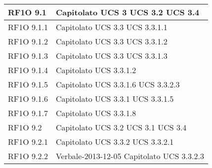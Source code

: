 \begin{center}
\begin{longtable}{ | p{5cm} | p{5cm} |}
        RF1O 9.1 &  Capitolato \newline  UCS 3 \newline  UCS 3.2 \newline  UCS 3.4 \newline  \\ \hline      
        RF1O 9.1.1 &  Capitolato \newline  UCS 3.3 \newline  UCS 3.3.1.1 \newline  \\ \hline      
        RF1O 9.1.2 &  Capitolato \newline  UCS 3.3 \newline  UCS 3.3.1.2 \newline  \\ \hline      
        RF1O 9.1.3 &  Capitolato \newline  UCS 3.3 \newline  UCS 3.3.1.3 \newline  \\ \hline      
        RF1O 9.1.4 &  Capitolato \newline  UCS 3.3.1.2 \newline  \\ \hline      
        RF1O 9.1.5 &  Capitolato \newline  UCS 3.3.1.6 \newline  UCS 3.3.2.3 \newline  \\ \hline      
        RF1O 9.1.6 &  Capitolato \newline  UCS 3.3.1 \newline  UCS 3.3.1.5 \newline  \\ \hline      
        RF1O 9.1.7 &  Capitolato \newline  UCS 3.3.1.8 \newline  \\ \hline      
        RF1O 9.2 &  Capitolato \newline  UCS 3.2 \newline  UCS 3.1 \newline  UCS 3.4 \newline  \\ \hline      
        RF1O 9.2.1 &  Capitolato \newline  UCS 3.3.2 \newline  UCS 3.3.2.1 \newline  \\ \hline      
        RF1O 9.2.2 &  Verbale-2013-12-05 \newline  Capitolato \newline  UCS 3.3.2.3 \newline  \\ \hline      

\end{longtable}
\end{center}
